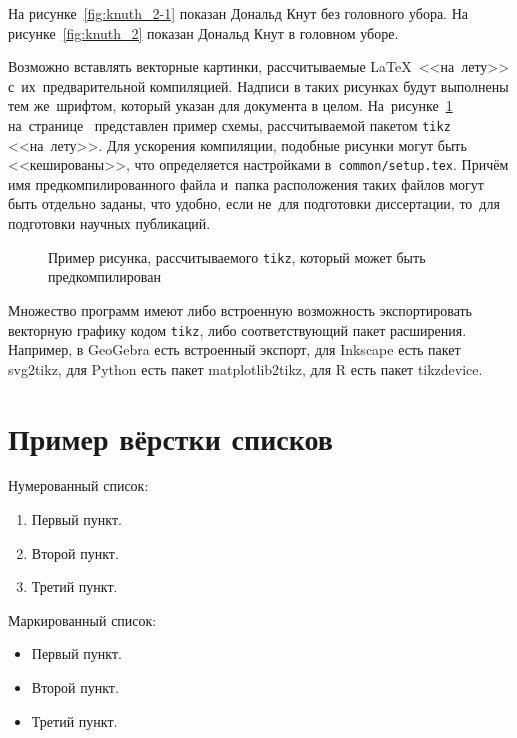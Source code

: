На рисунке~\cref{fig:knuth_2-1} показан Дональд Кнут без головного убора.
На рисунке~\cref{fig:knuth_2}
показан Дональд Кнут в головном уборе.

Возможно вставлять векторные картинки, рассчитываемые \LaTeX\ <<на~лету>>
с~их~предварительной компиляцией. Надписи в таких рисунках будут выполнены
тем же~шрифтом, который указан для документа в целом.
На~рисунке~\cref{fig:tikz_example} на~странице~\pageref{fig:tikz_example}
представлен пример схемы, рассчитываемой пакетом \verb|tikz| <<на~лету>>.
Для ускорения компиляции, подобные рисунки могут быть <<кешированы>>, что
определяется настройками в~\verb|common/setup.tex|.
Причём имя предкомпилированного
файла и~папка расположения таких файлов могут быть отдельно заданы,
что удобно, если не~для подготовки диссертации,
то~для подготовки научных публикаций.
\begin{figure}[ht]
    \legend{}
    \caption[Пример \texttt{tikz} схемы]{Пример рисунка, рассчитываемого
        \texttt{tikz}, который может быть предкомпилирован}\label{fig:tikz_example}
\end{figure}

Множество программ имеют либо встроенную возможность экспортировать векторную
графику кодом \verb|tikz|, либо соответствующий пакет расширения.
Например, в GeoGebra есть встроенный экспорт,
для Inkscape есть пакет svg2tikz,
для Python есть пакет matplotlib2tikz,
для R есть пакет tikzdevice.

\section{Пример вёрстки списков}\label{sec:ch2/sec3}

\noindent Нумерованный список:
\begin{enumerate}
  \item Первый пункт.
  \item Второй пункт.
  \item Третий пункт.
\end{enumerate}

\noindent Маркированный список:
\begin{itemize}
  \item Первый пункт.
  \item Второй пункт.
  \item Третий пункт.
\end{itemize}

